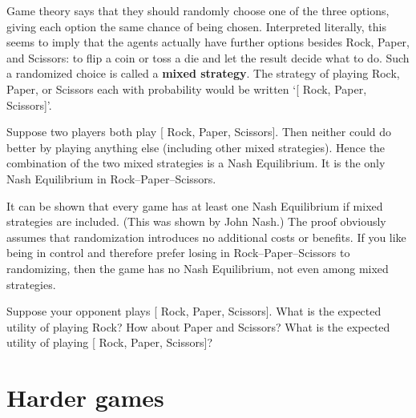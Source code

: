 Game theory says that they should randomly choose one of the three
options, giving each option the same chance of being chosen.
Interpreted literally, this seems to imply that the agents actually
have further options besides Rock, Paper, and Scissors: to flip a
coin or toss a die and let the result decide what to do. Such a
randomized choice is called a \textbf{mixed strategy}. The strategy of
playing Rock, Paper, or Scissors each with probability 
would be written `[ Rock,  Paper,
 Scissors]'.

Suppose two players both play [ Rock, 
Paper,  Scissors]. Then neither could do better by
playing anything else (including other mixed strategies). Hence the
combination of the two mixed strategies is a Nash Equilibrium. It is
the only Nash Equilibrium in Rock--Paper--Scissors.

It can be shown that every game has at least one Nash Equilibrium if
mixed strategies are included. (This was shown by John Nash.) The
proof obviously assumes that randomization introduces no additional
costs or benefits. If you like being in control and therefore prefer
losing in Rock--Paper--Scissors to randomizing, then the game has no
Nash Equilibrium, not even among mixed strategies.

\begin{exercise}{2}
  Suppose your opponent plays [ Rock, 
  Paper,  Scissors]. What is the expected utility of
  playing Rock? How about Paper and Scissors? What is the expected
  utility of playing [ Rock, 
  Paper,  Scissors]? 
\end{exercise}

\section{Harder games}

